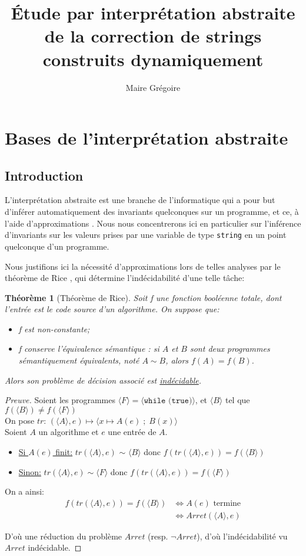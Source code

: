 \documentclass{article}
\title{Étude par interprétation abstraite de la correction de strings construits dynamiquement}
\author{Maire Grégoire}
\date{}
\newenvironment{preuve}{\begin{proof}[Preuve]}{\end{proof}}
\newtheorem{theo}{Théorème}
\newenvironment{mdtheo}[1][]%
   {\begin{mdframed}[linecolor=black]\begin{theo}[#1]}
   {\end{theo}\end{mdframed}}
\newcommand{\prog}[1]{{\langle #1 \rangle}}
\begin{document}
\maketitle

\section{Bases de l'interprétation abstraite}
\subsection{Introduction}
L'interprétation abstraite est une branche de l'informatique qui a pour but d'inférer
automatiquement des invariants quelconques sur un programme, et ce, à l'aide d'approximations \cite{CousotCousot77-1}.
Nous nous concentrerons ici en particulier sur l'inférence d'invariants sur les valeurs prises par
une variable de type \texttt{string} en un point quelconque d'un programme.

Nous justifions ici la nécessité d'approximations lors de telles analyses par le théorème de Rice \cite{Rice},
qui détermine l'indécidabilité d'une telle tâche:

\begin{mdtheo}[Théorème de Rice]
    Soit f une fonction booléenne totale, dont l'entrée est le code source d'un algorithme. On suppose que:
    \begin{itemize}
        \item f est non-constante;
        \item f conserve l'équivalence sémantique : si $A$ et $B$ sont deux programmes
        sémantiquement équivalents, noté $A \sim B$, alors $f(A) = f(B)$.
    \end{itemize}
    Alors son problème de décision associé est \underline{indécidable}.
\end{mdtheo}

\begin{preuve}
    Soient les programmes $\prog{F} = \prog{\texttt{while (true)}}$,
    et $\prog{B}$ tel que $f(\prog{B}) \neq f(\prog{F})$ \\
    On pose $tr$: $(\prog{A},e) \longmapsto \prog{x \mapsto A(e) \;;\; B(x)}$ \\
    Soient $A$ un algorithme et $e$ une entrée de $A$.
    \begin{itemize}
        \item \underline{Si $A(e)$ finit:} $tr(\prog{A}, e)$ $\sim$ $\prog{B}$ donc $f(tr(\prog{A}, e)) = f(\prog{B})$
        \item \underline{Sinon:} $tr(\prog{A}, e) \sim \prog{F}$ donc $f(tr(\prog{A}, e)) = f(\prog{F})$
    \end{itemize}    
    On a ainsi:
    \begin{align*}
      f(tr(\prog{A}, e)) = f(\prog{B}) & \iff A(e) \text{ termine} \\
                                       & \iff Arret(\prog{A}, e)
    \end{align*}
  
    D'où une réduction du problème $Arret$ (resp. $\neg Arret$), d'où l'indécidabilité vu $Arret$ indécidable.
\end{preuve}
\end{document}
